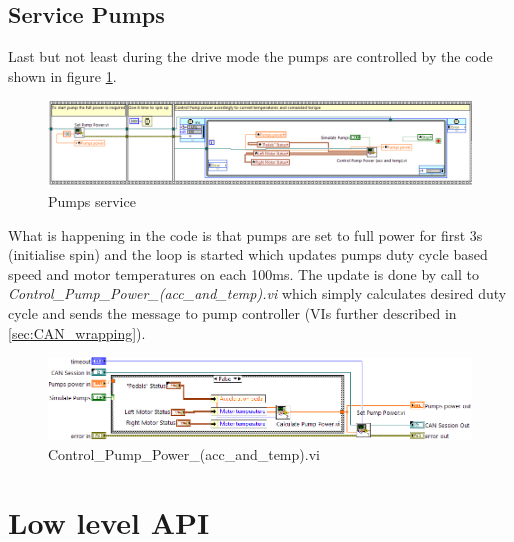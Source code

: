 \subsection{Service Pumps}
Last but not least during the drive mode the pumps are controlled by the code shown in figure \ref{pumps_service}.
\begin{figure}[H]
    \centering
    \includegraphics[scale=\visc,max width=\textwidth]{figures/Pumps}
    \caption{Pumps service}
    \label{pumps_service}
\end{figure}
What is happening in the code is that pumps are set to full power for first 3s (initialise spin) and the loop is started which updates pumps duty cycle based speed and motor temperatures on each 100ms.
The update is done by call to \textit{Control\_Pump\_Power\-\_(acc\_and\_temp).vi} which simply calculates desired duty cycle and sends the message to pump controller (VIs further described in \ref{sec:CAN_wrapping}).
\begin{figure}[H]
    \centering
    \includegraphics[scale=\visc,max width=\textwidth]{figures/Control_Pump_Power_(acc_and_temp)d_e}
    \caption{Control\_Pump\_Power\_(acc\_and\_temp).vi}
    \label{vi:Control_Pump_Power_(acc_and_temp)}
\end{figure}

\section{Low level API}
